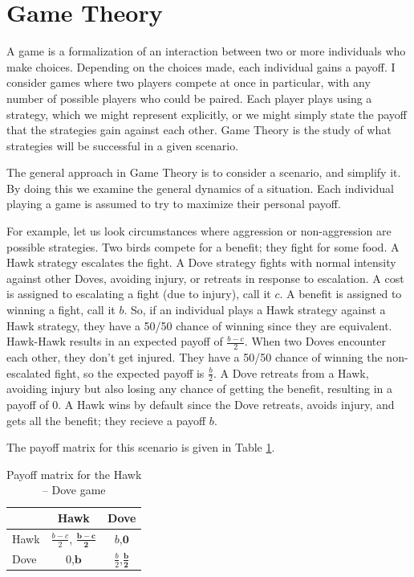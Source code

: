 \documentclass[a4paper,11pt,bcshonoursthesis,singlespace,oneside,thesisdraft,pdflatex]{cssethesis}
\begin{document}
\section{Game Theory}
A game is a formalization of an interaction between two or more individuals who make choices. 
Depending on the choices made, each individual gains a payoff.  
I consider games where two players compete at once in particular, with any number of possible players who could be paired. 
Each player plays using a strategy, which we might represent explicitly, or we might simply state the payoff that the strategies gain against each other. 
Game Theory is the study of what strategies will be successful in a given scenario. 

The general approach in Game Theory is to consider a scenario, and simplify it. 
By doing this we examine the general dynamics of a situation. 
Each individual playing a game is assumed to try to maximize their personal payoff. 

For example, let us look circumstances where aggression or non-aggression are possible strategies. 
Two birds compete for a benefit; they fight for some food. 
A Hawk strategy escalates the fight. A Dove strategy fights with normal intensity against other Doves, avoiding injury, or retreats in response to escalation. 
A cost is assigned to escalating a fight (due to injury), call it $c$. 
A benefit is assigned to winning a fight, call it $b$. 
So, if an individual plays a Hawk strategy against a Hawk strategy, they have a 50/50 chance of winning since they are equivalent. Hawk-Hawk results in an expected payoff of $\frac{{b}-{c}}{2}$. 
When two Doves encounter each other, they don't get injured. 
They have a 50/50 chance of winning the non-escalated fight, so the expected payoff is $\frac{b}{2}$. 
A Dove retreats from a Hawk, avoiding injury but also losing any chance of getting the benefit, resulting in a payoff of $0$. A Hawk wins by default since the Dove retreats, avoids injury, and gets all the benefit; they recieve a payoff $b$. 

The payoff matrix for this scenario is given in Table \ref{table:payoffHD}.
\begin{table}[h]\centering
\captionsetup{justification=centering}
\begin{tabular}{|l|c|c|}
\hline
 & \bf{Hawk} & \bf{Dove}\\
\hline
Hawk & $\frac{{b}-{c}}{2}$, {$\boldsymbol{\frac{{b}-{c}}{2}}$} & $b$,$\boldsymbol{0}$\\
\hline
Dove & $0$,$\boldsymbol{b}$ & $\frac{b}{2}$,$\boldsymbol{\frac{b}{2}}$ \\
\hline
\end{tabular}
\caption{Payoff matrix for the Hawk -- Dove game}
\label{table:payoffHD}
\end{table}
\end{document}
